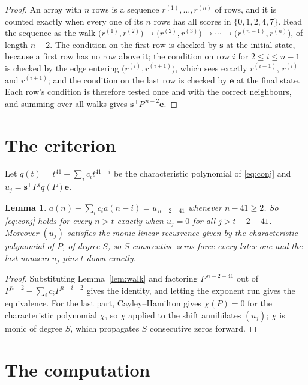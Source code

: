 \documentclass[11pt,a4paper]{article}
\theoremstyle{plain}
\newtheorem{lemma}[theorem]{Lemma}
\theoremstyle{definition}
\begin{document}
\begin{proof}
An array with $n$ rows is a sequence $r^{(1)},\dots,r^{(n)}$ of rows, and it is counted
exactly when every one of its $n$ rows has all scores in $\{0,1,2,4,7\}$. Read the sequence as the
walk $\bigl(r^{(1)},r^{(2)}\bigr)\to\bigl(r^{(2)},r^{(3)}\bigr)\to\cdots\to
\bigl(r^{(n-1)},r^{(n)}\bigr)$, of length $n-2$. The condition on the first row is
checked by $\mathbf{s}$ at the initial state, because a first row has no row above it; the
condition on row $i$ for $2\le i\le n-1$ is checked by the edge entering
$\bigl(r^{(i)},r^{(i+1)}\bigr)$, which sees exactly $r^{(i-1)}$, $r^{(i)}$ and
$r^{(i+1)}$; and the condition on the last row is checked by $\mathbf{e}$ at the final
state. Each row's condition is therefore tested once and with the correct neighbours, and
summing over all walks gives $\mathbf{s}^{\!\top}P^{\,n-2}\mathbf{e}$.
\end{proof}

\section{The criterion}

Let $q(t)=t^{41}-\sum_i c_i t^{41-i}$ be the characteristic polynomial of
\eqref{eq:conj} and $u_j=\mathbf{s}^{\!\top}P^{j}q(P)\mathbf{e}$.

\begin{lemma}\label{lem:crit}
$a(n)-\sum_i c_i a(n-i)=u_{\,n-2-41}$ whenever $n-41\ge2$. So \eqref{eq:conj}
holds for every $n>t$ exactly when $u_j=0$ for all $j>t-2-41$. Moreover $(u_j)$
satisfies the monic linear recurrence given by the characteristic polynomial of $P$, of
degree $S$, so $S$ consecutive zeros force every later one and the last nonzero $u_j$ pins
$t$ down exactly.
\end{lemma}

\begin{proof}
Substituting Lemma~\ref{lem:walk} and factoring $P^{\,n-2-41}$ out of
$P^{n-2}-\sum_i c_i P^{n-i-2}$ gives the identity, and letting the exponent run gives the
equivalence. For the last part, Cayley--Hamilton gives $\chi(P)=0$ for the characteristic
polynomial $\chi$, so $\chi$ applied to the shift annihilates $(u_j)$; $\chi$ is monic of
degree $S$, which propagates $S$ consecutive zeros forward.
\end{proof}

\section{The computation}
\end{document}
